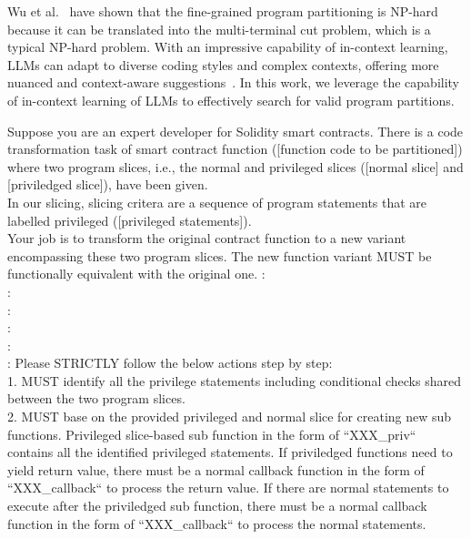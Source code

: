 Wu et al.~\cite{wu2013automatically} have shown that the fine-grained program partitioning is NP-hard because it can be translated into the multi-terminal cut problem, which is a typical NP-hard problem.
With an impressive capability of in-context learning, LLMs can adapt to diverse coding styles and complex contexts, offering more nuanced and context-aware suggestions~\cite{shirafuji2023refactoring}. 
In this work, we leverage the capability of in-context learning of LLMs to effectively search for valid program partitions.

\begin{figure*}[t]
    \begin{tcolorbox}[title=Generation/Repairing Prompt for Program Partitions]
Suppose you are an expert developer for Solidity smart contracts. There is a code transformation task of smart contract function ([function code to be partitioned]) where two program slices, i.e., the normal and privileged slices ([normal slice] and [priviledged slice]), have been given. \\
In our slicing, slicing critera are a sequence of program statements that are labelled privileged ([privileged statements]). \\
Your job is to transform the original contract function to a new variant encompassing these two program slices. The new function variant MUST be functionally equivalent with the original one.
\tcbline
{}:        \\
:    \\
:                     \\
: 
\tcbline
{} \\
:        \\
\text{[explanation]}:        
\tcbline
Please STRICTLY follow the below actions step by step: \\
1. MUST identify all the privilege statements including conditional checks shared between the two program slices.\\
2. MUST base on the provided privileged and normal slice for creating new sub functions. Privileged slice-based sub function in the form of ``XXX\_priv`` contains all the identified privileged statements. If priviledged functions need to yield return value, there must be a normal callback function in the form of ``XXX\_callback`` to process the return value. If there are normal statements to execute after the priviledged sub function, there must be a normal callback function in the form of ``XXX\_callback`` to process the normal statements.\\

\end{tcolorbox}
\end{figure*}
